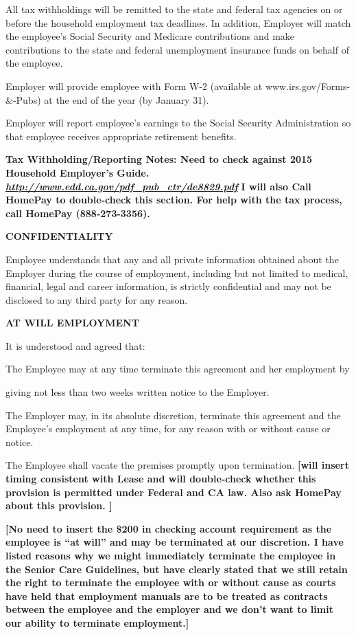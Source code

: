 \documentclass[]{article}
\begin{document}
All tax withholdings will be remitted to the state and federal tax
agencies on or before the household employment tax deadlines. In
addition, Employer will match the employee's Social Security and
Medicare contributions and make contributions to the state and federal
unemployment insurance funds on behalf of the employee.

Employer will provide employee with Form W-2 (available at
www.irs.gov/Forms-\&-Pubs) at the end of the year (by January 31).

Employer will report employee's earnings to the Social Security
Administration so that employee receives appropriate retirement
benefits.

\textbf{Tax Withholding/Reporting Notes: Need to check against 2015
Household Employer's Guide.}
\href{http://www.edd.ca.gov/pdf_pub_ctr/de8829.pdf}{\textbf{\emph{http://www.edd.ca.gov/pdf\_pub\_ctr/de8829.pdf}}}
\textbf{I will also Call HomePay to double-check this section. For help
with the tax process, call HomePay (888-273-3356). }

\textbf{CONFIDENTIALITY}

Employee understands that any and all private information obtained about
the Employer during the course of employment, including but not limited
to medical, financial, legal and career information, is strictly
confidential and may not be disclosed to any third party for any reason.

\textbf{AT WILL EMPLOYMENT}

It is understood and agreed that:

The Employee may at any time terminate this agreement and her employment
by

giving not less than two weeks written notice to the Employer.

The Employer may, in its absolute discretion, terminate this agreement
and the Employee's employment at any time, for any reason with or
without cause or notice.

The Employee shall vacate the premises promptly upon termination.
\textbf{{[}will insert timing consistent with Lease and will
double-check whether this provision is permitted under Federal and CA
law. Also ask HomePay about this provision. {]}}

\textbf{{[}No need to insert the \$200 in checking account requirement
as the employee is ``at will'' and may be terminated at our discretion.
I have listed reasons why we might immediately terminate the employee in
the Senior Care Guidelines, but have clearly stated that we still retain
the right to terminate the employee with or without cause as courts have
held that employment manuals are to be treated as contracts between the
employee and the employer and we don't want to limit our ability to
terminate employment.{]} }
\end{document}
